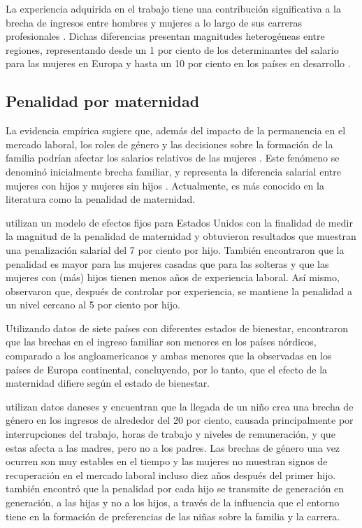 La experiencia adquirida en el trabajo tiene una contribución significativa a la brecha de ingresos entre hombres y mujeres a lo largo de sus carreras profesionales \citep{Kleven2019}.  Dichas diferencias presentan magnitudes heterogéneas entre regiones, representando desde un 1 por ciento de los determinantes del salario para las mujeres en Europa y hasta un 10 por ciento en los países en desarrollo \citep{Weichselbaumer2005}. 
\subsection{Penalidad por maternidad}                        
La evidencia empírica sugiere que, además del impacto de la permanencia en el mercado laboral, los roles de género y las decisiones sobre la formación de la familia podrían afectar los salarios relativos de las mujeres \citep{Blau2017}. Este fenómeno se denominó inicialmente brecha familiar, y representa la diferencia salarial entre mujeres con hijos y mujeres sin hijos \citep{Waldfogel1998}. Actualmente, es más conocido en la literatura como la penalidad de maternidad.

\citet{Budig2001} utilizan un modelo de efectos fijos para Estados Unidos con la finalidad de medir la magnitud de la penalidad de maternidad y obtuvieron resultados que muestran una penalización salarial del 7 por ciento por hijo. También encontraron que la penalidad es mayor para las mujeres casadas que para las solteras y que las mujeres con (más) hijos tienen menos años de experiencia laboral. Así mismo, observaron que, después de controlar por experiencia, se mantiene la penalidad a un nivel cercano al 5 por ciento por hijo.

Utilizando datos de siete países con diferentes estados de bienestar, \citet{SigleRushton2007} encontraron que las brechas en el ingreso familiar son menores en los países nórdicos, comparado a los angloamericanos y ambas menores que la observadas en los países de Europa continental, concluyendo, por lo tanto, que el efecto de la maternidad difiere según el estado de bienestar.

\citet{Kleven2019} utilizan datos daneses y encuentran que la llegada de un niño crea una brecha de género en los ingresos de alrededor del 20 por ciento, causada principalmente por interrupciones del trabajo, horas de trabajo y niveles de remuneración, y que estas afecta a las madres, pero no a los padres. Las brechas de género una vez ocurren son muy estables en el tiempo y las mujeres no muestran signos de recuperación en el mercado laboral incluso diez años después del primer hijo. \citet{Kleven2019} también encontró que la penalidad por cada hijo se transmite de generación en generación, a las hijas y no a los hijos, a través de la influencia que el entorno tiene en la formación de preferencias de las niñas sobre la familia y la carrera.

